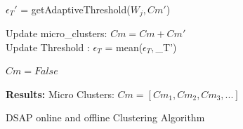 \begin{algorithm}[htbp]
{{         %
         {                                  \hfill {}\\
                $\epsilon_T'$ = getAdaptiveThreshold($W_j,Cm'$)

         }

        Update micro\_clusters: $Cm = Cm + Cm'$ \\
        Update Threshold : $\epsilon_T$ = mean($\epsilon_T, $\epsilon_T')
        
        

      }
       
        {$Cm = False$}
         
        \textbf{Results: } Micro Clusters: $Cm= [Cm_1,Cm_2,Cm_3, ...]$ %
        }
            

         
       
\caption{DSAP online and offline Clustering Algorithm}
    \label{algSDAPi}
\end{algorithm}


